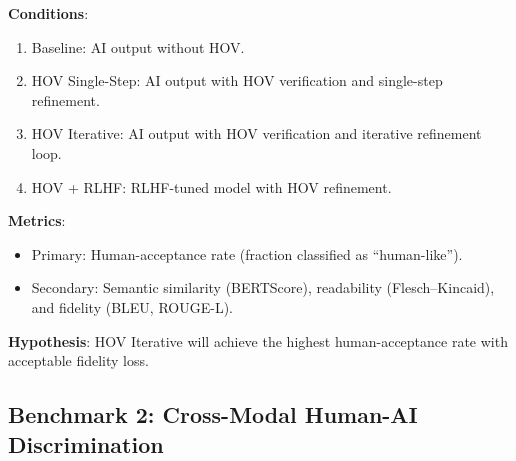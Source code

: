 \documentclass[12pt,oneside]{article}
\begin{document}
\textbf{Conditions}:
\begin{enumerate}[noitemsep]
    \item Baseline: AI output without HOV.
    \item HOV Single-Step: AI output with HOV verification and single-step refinement.
    \item HOV Iterative: AI output with HOV verification and iterative refinement loop.
    \item HOV + RLHF: RLHF-tuned model with HOV refinement.
\end{enumerate}

\textbf{Metrics}:
\begin{itemize}[noitemsep]
    \item Primary: Human-acceptance rate (fraction classified as ``human-like'').
    \item Secondary: Semantic similarity (BERTScore), readability (Flesch--Kincaid), and fidelity (BLEU, ROUGE-L).
\end{itemize}

\textbf{Hypothesis}: HOV Iterative will achieve the highest human-acceptance rate with acceptable fidelity loss.

\subsection{Benchmark 2: Cross-Modal Human-AI Discrimination}
\end{document}
